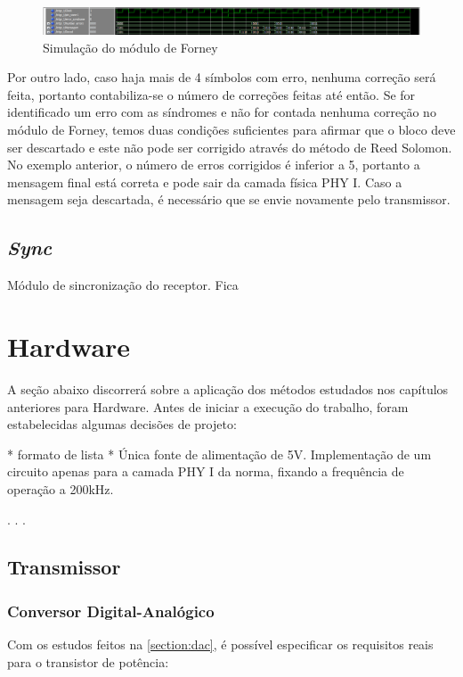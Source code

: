 	\begin{figure}[!htb]
		\caption{\label{fig_forney_sim} Simulação do módulo de Forney}
		\centering
		\includegraphics[width=1\textwidth]{RS/Sim_forney.PNG}
		\legend{}
	\end{figure}
	
	Por outro lado, caso haja mais de 4 símbolos com erro, nenhuma correção será feita, portanto contabiliza-se o número de correções feitas até então. Se for identificado um erro com as síndromes e não for contada nenhuma correção no módulo de Forney, temos duas condições suficientes para afirmar que o bloco deve ser descartado e este não pode ser corrigido através do método de Reed Solomon. No exemplo anterior, o número de erros corrigidos é inferior a 5, portanto a mensagem final está correta e pode sair da camada física PHY I. Caso a mensagem seja descartada, é necessário que se envie novamente pelo transmissor.
	
	\subsection{\textit{Sync}}
	
	Módulo de sincronização do receptor. Fica 
	
	
	\section{Hardware}
	A seção abaixo discorrerá sobre a aplicação dos métodos estudados nos capítulos anteriores para Hardware.
	Antes de iniciar a execução do trabalho, foram estabelecidas algumas decisões de projeto:
	
	* formato de lista *
	Única fonte de alimentação de 5V.
	Implementação de um circuito apenas para a camada PHY I da norma, fixando a frequência de operação a 200kHz.
	
	. . .
	
	\subsection{Transmissor}
	
	\subsubsection{Conversor Digital-Analógico}
	Com os estudos feitos na \autoref{section:dac}, é possível especificar os requisitos reais para o transistor de potência:

